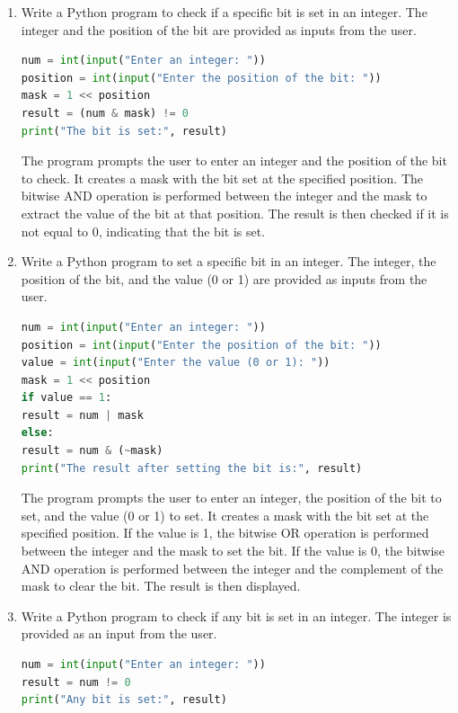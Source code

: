\documentclass[12pt]{book}
\begin{document}
\begin{enumerate}
\item Write a Python program to check if a specific bit is set in an integer. The integer and the position of the bit are provided as inputs from the user.

\begin{lstlisting}[language=Python]
num = int(input("Enter an integer: "))
position = int(input("Enter the position of the bit: "))
mask = 1 << position
result = (num & mask) != 0
print("The bit is set:", result)
\end{lstlisting}

The program prompts the user to enter an integer and the position of the bit to check. It creates a mask with the bit set at the specified position. The bitwise AND operation is performed between the integer and the mask to extract the value of the bit at that position. The result is then checked if it is not equal to 0, indicating that the bit is set.

\item Write a Python program to set a specific bit in an integer. The integer, the position of the bit, and the value (0 or 1) are provided as inputs from the user.

\begin{lstlisting}[language=Python]
num = int(input("Enter an integer: "))
position = int(input("Enter the position of the bit: "))
value = int(input("Enter the value (0 or 1): "))
mask = 1 << position
if value == 1:
result = num | mask
else:
result = num & (~mask)
print("The result after setting the bit is:", result)
\end{lstlisting}

The program prompts the user to enter an integer, the position of the bit to set, and the value (0 or 1) to set. It creates a mask with the bit set at the specified position. If the value is 1, the bitwise OR operation is performed between the integer and the mask to set the bit. If the value is 0, the bitwise AND operation is performed between the integer and the complement of the mask to clear the bit. The result is then displayed.

\item Write a Python program to check if any bit is set in an integer. The integer is provided as an input from the user.

\begin{lstlisting}[language=Python]
num = int(input("Enter an integer: "))
result = num != 0
print("Any bit is set:", result)
\end{lstlisting}


\end{enumerate}
\end{document}
